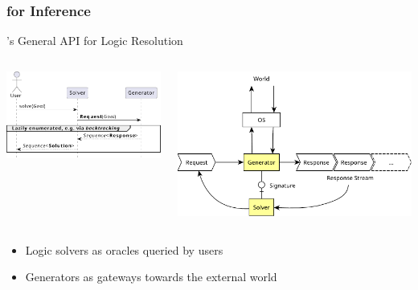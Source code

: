 \documentclass[presentation]{beamer}\mode<presentation>{\usetheme{AMSBolognaFC}}
\begin{document}
\subsubsection{\twopkt{} for Inference}

\begin{frame}{\twopkt{}'s General API for Logic Resolution}

    \begin{columns}
        \begin{column}{.49\linewidth}
            \includegraphics[width=\linewidth]{figures/primitive-usage.pdf}
        \end{column}
        \begin{column}{.49\linewidth}
            \includegraphics[width=\linewidth]{figures/generator.pdf}
        \end{column}
    \end{columns}

    \vfill

    \begin{itemize}
        \item Logic solvers as oracles queried by users
        
        \vfill

        \item Generators as gateways towards the external world
    \end{itemize}
\end{frame}
\end{document}
